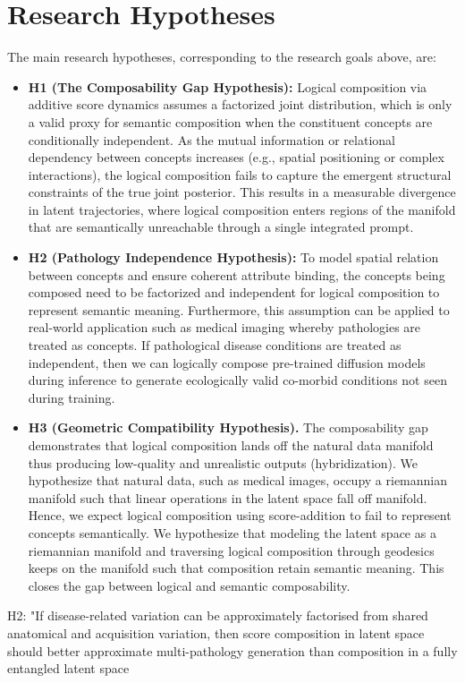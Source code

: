 \section{Research Hypotheses}
\label{sec:research_objectives_research_hypothesis}

The main research hypotheses, corresponding to the research goals above, are:

\begin{itemize}
    \item \textbf{H1 (The Composability Gap Hypothesis):}
    Logical composition via additive score dynamics assumes a factorized joint distribution, which is only a valid proxy for semantic composition when the constituent concepts are conditionally independent.
    As the mutual information or relational dependency between concepts increases (e.g., spatial positioning or complex interactions), the logical composition fails to capture the emergent structural constraints of the true joint posterior.
    This results in a measurable divergence in latent trajectories, where logical composition enters regions of the manifold that are semantically unreachable through a single integrated prompt.
    \item \textbf{H2 (Pathology Independence Hypothesis):}
    To model spatial relation between concepts and ensure coherent attribute binding, the concepts being composed need to be factorized and independent for logical composition to represent semantic meaning.
    Furthermore, this assumption can be applied to real-world application such as medical imaging whereby pathologies are treated as concepts. If pathological disease conditions are treated as independent,
    then we can logically compose pre-trained diffusion models during inference to generate ecologically valid co-morbid conditions not seen during training.
    \item \textbf{H3 (Geometric Compatibility Hypothesis).}
    The composability gap demonstrates that logical composition lands off the natural data manifold thus producing low-quality and unrealistic outputs (hybridization).
    We hypothesize that natural data, such as medical images, occupy a riemannian manifold such that linear operations in the latent space fall off manifold.
    Hence, we expect logical composition using score-addition to fail to represent concepts semantically.
    We hypothesize that modeling the latent space as a riemannian manifold and traversing logical composition through geodesics keeps on the manifold such that
    composition retain semantic meaning. This closes the gap between logical and semantic composability.
\end{itemize}


H2: "If disease-related variation can be approximately factorised from shared anatomical and acquisition variation, then score composition in latent space should better approximate multi-pathology generation than composition in a fully entangled latent space
